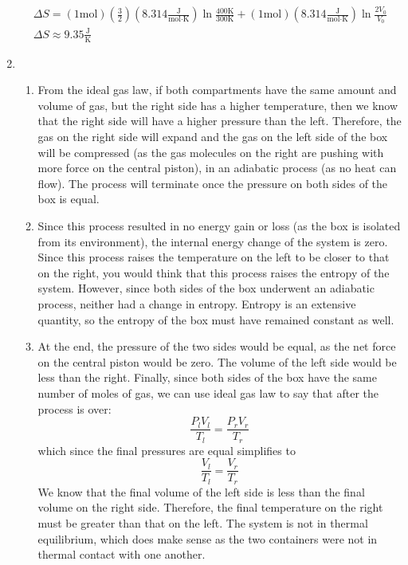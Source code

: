 \begin{enumerate}
\begin{gather*}
        \Delta S = (1\textrm{mol})(\frac{3}{2})(8.314\frac{\textrm{J}}{\textrm{mol}\cdot \textrm{K}})\ln{\frac{400\textrm{K}}{300\textrm{K}}} + (1\textrm{mol})(8.314\frac{\textrm{J}}{\textrm{mol}\cdot \textrm{K}})\ln{\frac{2V_0}{V_0}} \\
        \Delta S \approx 9.35\frac{\textrm{J}}{\textrm{K}}
    \end{gather*}
    \item
    \begin{enumerate}
        \item From the ideal gas law, if both compartments have the same amount and volume of gas, but the right side has a higher temperature, then we know that the right side will have a higher pressure than the left. Therefore, the gas on the right side will expand and the gas on the left side of the box will be compressed (as the gas molecules on the right are pushing with more force on the central piston), in an adiabatic process (as no heat can flow). The process will terminate once the pressure on both sides of the box is equal.
        \item Since this process resulted in no energy gain or loss (as the box is isolated from its environment), the internal energy change of the system is zero. Since this process raises the temperature on the left to be closer to that on the right, you would think that this process raises the entropy of the system. However, since both sides of the box underwent an adiabatic process, neither had a change in entropy. Entropy is an extensive quantity, so the entropy of the box must have remained constant as well.
        \item At the end, the pressure of the two sides would be equal, as the net force on the central piston would be zero. The volume of the left side would be less than the right. Finally, since both sides of the box have the same number of moles of gas, we can use ideal gas law to say that after the process is over:
    \[
        \frac{P_lV_l}{T_l} = \frac{P_rV_r}{T_r}
    \]
    which since the final pressures are equal simplifies to
    \[
        \frac{V_l}{T_l} = \frac{V_r}{T_r}
    \]
    We know that the final volume of the left side is less than the final volume on the right side. Therefore, the final temperature on the right must be greater than that on the left. The system is not in thermal equilibrium, which does make sense as the two containers were not in thermal contact with one another.
    \end{enumerate}   
\end{enumerate}